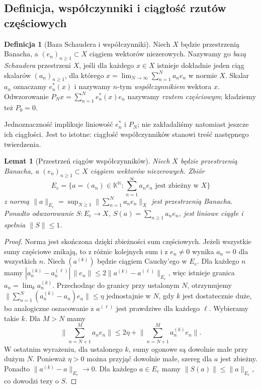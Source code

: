 \documentclass[11pt,a4paper]{article}
\numberwithin{equation}{section}
\theoremstyle{plain}
\newtheorem{lemat}[twierdzenie]{Lemat}
\theoremstyle{definition}
\newtheorem{definicja}[twierdzenie]{Definicja}
\theoremstyle{remark}
\newcommand{\N}{\mathbb N}
\newcommand{\K}{\mathbb K}
\begin{document}
\subsection{Definicja, współczynniki i ciągłość rzutów częściowych}

\begin{definicja}[Baza Schaudera i współczynniki]
\label{def:schauder27}
Niech $X$ będzie przestrzenią Banacha, a $(e_n)_{n\ge1}\subset X$
ciągiem wektorów niezerowych. Nazywamy go \emph{bazą Schaudera}
przestrzeni $X$, jeśli dla każdego $x\in X$ istnieje dokładnie jeden
ciąg skalarów $(a_n)_{n\ge1}$, dla którego
$x=\lim_{N\to\infty}\sum_{n=1}^N a_ne_n$ w normie $X$.
Skalar $a_n$ oznaczamy $e_n^*(x)$ i nazywamy $n$-tym
\emph{współczynnikiem} wektora $x$. Odwzorowanie
$P_Nx=\sum_{n=1}^Ne_n^*(x)e_n$ nazywamy
\emph{rzutem częściowym}; kładziemy też $P_0=0$.
\end{definicja}

Jednoznaczność implikuje liniowość $e_n^*$ i $P_N$; nie zakładaliśmy
natomiast jeszcze ich ciągłości. Jest to istotne: ciągłość
współczynników stanowi treść następnego twierdzenia.

\begin{lemat}[Przestrzeń ciągów współczynników]
\label{lem:coefficient-space27}
Niech $X$ będzie przestrzenią Banacha, a $(e_n)_{n\ge1}\subset X$
ciągiem wektorów niezerowych. Zbiór
\[
E_e=\bigl\{a=(a_n)\in\K^{\N}:\sum_{n=1}^{\infty}a_ne_n
\text{ jest zbieżny w }X\bigr\}
\]
z normą $\|a\|_{E_e}=\sup_{N\ge1}\|\sum_{n=1}^Na_ne_n\|_X$
jest przestrzenią Banacha. Ponadto odwzorowanie
$S:E_e\to X$, $S(a)=\sum_{n\ge1}a_ne_n$, jest liniowe
ciągłe i spełnia $\|S\|\le1$.
\end{lemat}
\begin{proof}
Norma jest skończona dzięki zbieżności sum częściowych.
Jeżeli wszystkie sumy częściowe znikają, to z różnic kolejnych
sum i z $e_n\ne0$ wynika $a_n=0$ dla wszystkich $n$.
Niech $(a^{(k)})$ będzie ciągiem Cauchy'ego w $E_e$.
Dla każdego $n$ mamy
$|a_n^{(k)}-a_n^{(\ell)}|\,\|e_n\|
\le2\|a^{(k)}-a^{(\ell)}\|_{E_e}$,
więc istnieje granica $a_n=\lim_k a_n^{(k)}$.
Przechodząc do granicy przy ustalonym $N$, otrzymujemy
$\|\sum_{n=1}^N(a_n^{(k)}-a_n)e_n\|\le\eta$
jednostajnie w $N$, gdy $k$ jest dostatecznie duże,
bo analogiczne oszacowanie z $a^{(\ell)}$ jest
prawdziwe dla każdego $\ell$.
Wybieramy takie $k$. Dla $M>N$ mamy
\[
\Big\|\sum_{n=N+1}^Ma_ne_n\Big\|
\le2\eta+\Big\|\sum_{n=N+1}^Ma_n^{(k)}e_n\Big\|.
\]
W ostatnim wyrażeniu, dla ustalonego $k$, sumy ogonowe
są dowolnie małe przy dużym $N$. Ponieważ $\eta>0$
można przyjąć dowolnie małe, szereg dla $a$ jest zbieżny.
Ponadto $\|a^{(k)}-a\|_{E_e}\to0$.
Dla każdego $a\in E_e$ mamy
$\|S(a)\|\le\|a\|_{E_e}$, co dowodzi tezy o $S$.
\end{proof}
\end{document}
